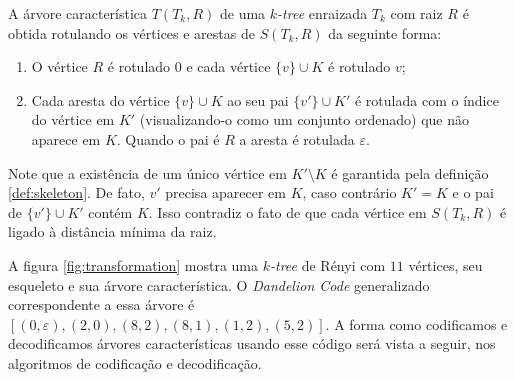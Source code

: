 \begin{definition}
  \label{def:chartree}
  \cite{caminiti} A árvore característica $T(T_k, R)$ de uma \emph{$k$-tree} enraizada $T_k$ com raiz $R$ é obtida rotulando os vértices e arestas de $S(T_k, R)$ da seguinte forma:

  \begin{enumerate}
    \item O vértice $R$ é rotulado $0$ e cada vértice $\{v\} \cup K$ é rotulado $v$;
    \item Cada aresta do vértice $\{v\} \cup K$ ao seu pai $\{v'\} \cup K'$ é rotulada com o índice do vértice em $K'$ (visualizando-o como um conjunto ordenado) que não aparece em $K$. Quando o pai é $R$ a aresta é rotulada $\varepsilon$.
  \end{enumerate}

  Note que a existência de um único vértice em $K' \setminus K$ é garantida pela definição \ref{def:skeleton}. De fato, $v'$ precisa aparecer em $K$, caso contrário $K' = K$ e o pai de $\{v'\} \cup K'$ contém $K$. Isso contradiz o fato de que cada vértice em $S(T_k, R)$ é ligado à distância mínima da raiz.
\end{definition}

A figura \ref{fig:transformation} mostra uma \emph{$k$-tree} de Rényi com $11$ vértices, seu esqueleto e sua árvore característica. O \emph{Dandelion Code} generalizado correspondente a essa árvore é $[(0, \varepsilon), (2, 0), (8, 2), (8, 1), (1, 2), (5, 2)]$. A forma como codificamos e decodificamos árvores características usando esse código será vista a seguir, nos algoritmos de codificação e decodificação.

